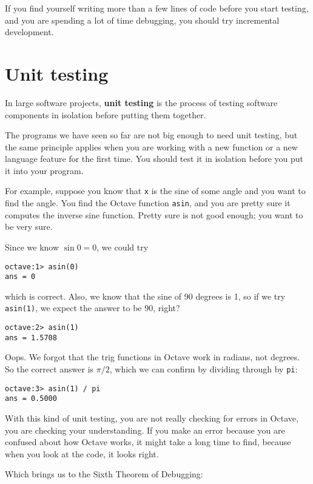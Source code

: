 If you find yourself writing more than a few lines of code before
you start testing, and you are spending a lot of time debugging,
you should try incremental development.

\section{Unit testing}

In large software projects, {\bf unit testing} is the process of
testing software components in isolation before putting
them together.

The programs we have seen so far are not
big enough to need unit testing, but the same principle applies
when you are working with a new function or a new language feature
for the first time. You should test it in isolation before you
put it into your program.

For example, suppose you know that {\tt x} is the sine of some
angle and you want to find the angle. You find the Octave function
{\tt asin}, and you are pretty sure it computes the inverse sine
function. Pretty sure is not good enough; you want to be very sure.

Since we know $\sin 0 = 0$, we could try

\begin{verbatim}
octave:1> asin(0)
ans = 0
\end{verbatim}

which is correct. Also, we know that the sine of 90 degrees is
1, so if we try {\tt asin(1)}, we expect the answer to be 90, right?

\begin{verbatim}
octave:2> asin(1)
ans = 1.5708
\end{verbatim}

Oops. We forgot that the trig functions in Octave work in radians,
not degrees. So the correct answer is $\pi/2$, which we can
confirm by dividing through by {\tt pi}:

\begin{verbatim}
octave:3> asin(1) / pi
ans = 0.5000
\end{verbatim}

With this kind of unit testing, you are not really checking for
errors in Octave, you are checking your understanding. If you
make an error because you are confused about how Octave works, it
might take a long time to find, because when you look at the code,
it looks right. 

Which brings us to the Sixth Theorem of Debugging:


